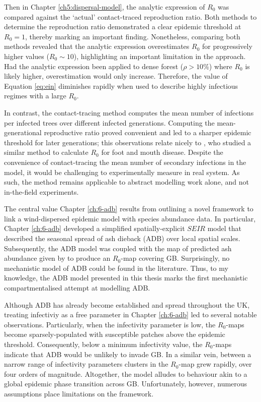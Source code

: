 Then in Chapter \ref{ch5:dispersal-model}, the analytic expression of $R_0$ was compared against the `actual' contact-traced reproduction ratio. 
Both methods to determine the reproduction ratio demonstrated a clear epidemic threshold at $R_0=1$, thereby marking an important finding.
Nonetheless, comparing both methods revealed that the analytic expression overestimates $R_0$ for progressively higher values ($R_0 \sim 10$),
highlighting an important limitation in the approach. 
Had the analytic expression been applied to dense forest ($\rho >10\%$) where $R_0$ is likely higher, overestimation would only increase.
Therefore, the value of Equation \ref{eq:ein} diminishes rapidly when used to describe highly infectious regimes with a large $R_0$.

In contrast, the contact-tracing method computes the mean number of infections per infected trees over different infected generations.
Computing the mean-generational reproductive ratio proved convenient and led to a sharper epidemic threshold for later generations;
this observations relate nicely to \cite{R0-perc-ref}, who studied a similar method to calculate $R_0$ for foot and mouth disease.
Despite the convenience of contact-tracing the mean number of secondary infections in the model, it would be challenging to experimentally measure in real system.
As such, the method remains applicable to abstract modelling work alone, and not in-the-field experiments.

The central value Chapter \ref{ch:6-adb} results from outlining a novel framework to link a wind-dispersed epidemic model with species abundance data.
In particular, Chapter \ref{ch:6-adb} developed a simplified spatially-explicit $SEIR$ model that described the seasonal spread of ash dieback (ADB) over local spatial scales.
Subsequently, the ADB model was coupled with the map of predicted ash abundance given by \cite{hill.data} to produce an $R_0$-map covering GB.  
Surprisingly, no mechanistic model of ADB could be found in the literature. Thus, to my knowledge, the ADB model presented in this thesis 
marks the first mechanistic compartmentalised attempt at modelling ADB. 

Although ADB has already become established and spread throughout the UK, treating infectiviy as a free parameter in Chapter \ref{ch:6-adb} led to several notable observations.
Particularly, when the infectivity parameter is low, the $R_0$-maps become sparsely-populated with susceptible patches above the epidemic threshold.
Consequently, below a minimum infectivity value, the $R_0$-maps indicate that ADB would be unlikely to invade GB.
In a similar vein, between a narrow range of infectivity parameters clusters in the $R_0$-map grew rapidly, over four orders of magnitude.
Altogether, the model alludes to behaviour akin to a global epidemic phase transition across GB. Unfortunately, however, numerous assumptions place limitations on the framework.

